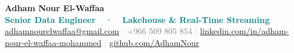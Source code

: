 \begin{center}
  {\fontsize{28}{32}\selectfont\textbf{\textcolor{darktext}{Adham Nour El-Waffaa}}}\\[4pt]
  {\normalsize\textbf{\textcolor{teal}{%
    Senior Data Engineer\ \ ·\ \ Lakehouse \& Real-Time Streaming\ \ %
  }}}\\[6pt]
  {\small
    \textcolor{lightgray}{\faEnvelope}\enspace
    \href{mailto:adhamnourelwaffaa@gmail.com}{adhamnourelwaffaa@gmail.com}
    \quad\textcolor{lightgray}{|}\quad
    \textcolor{lightgray}{\faPhone}\enspace
    \textcolor{graytext}{+966 509 805 854}
    \quad\textcolor{lightgray}{|}\quad
    \textcolor{lightgray}{\faLinkedin}\enspace
    \href{https://www.linkedin.com/in/adham-nour-el-waffaa-mohammed/}{linkedin.com/in/adham-nour-el-waffaa-mohammed}
    \quad\textcolor{lightgray}{|}\quad
    \textcolor{lightgray}{\faGithub}\enspace
    \href{https://github.com/AdhamNour}{github.com/AdhamNour}
  }
\end{center}
\vspace{2pt}
